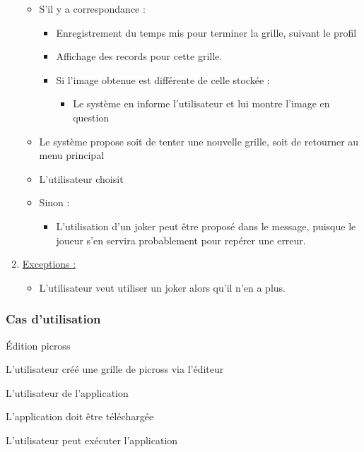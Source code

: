 \documentclass[a4paper, 12pt, twoside]{article}
\begin{document}
\begin{enumerate}
\begin{itemize}
		\item {S'il y a correspondance :}\newline
		\begin{itemize}\setlength{\itemsep}{3mm}
			\item Enregistrement du temps mis pour terminer la grille, suivant le profil
			\item Affichage des records pour cette grille.
			\item {Si l'image obtenue est diff\'erente de celle stock\'ee :}\newline
			\begin{itemize}
				\item Le système en informe l'utilisateur et lui montre l'image en question
			\end{itemize}					
		\end{itemize}	
		\item Le système propose soit de tenter une nouvelle grille, soit de retourner au menu principal
		\item L'utilisateur choisit

		\item {Sinon :}\newline
		\begin{itemize}\setlength{\itemsep}{3mm}
			\item L'utilisation d'un joker peut être proposé dans le message, puisque le joueur s'en servira probablement pour repérer une erreur.
		\end{itemize}			
	\end{itemize}

	\item{\ul{Exceptions :}}\newline
	\begin{itemize}\setlength{\itemsep}{5mm}
		\item L'utilisateur veut utiliser un joker alors qu'il n'en a plus.
	\end{itemize}
\end{enumerate}

\subsubsection*{Cas d'utilisation }

\begin{description}\setlength{\itemsep}{0mm}

 \item[Nom :] \'Edition picross 
 \item[Description :] L'utilisateur créé une grille de picross via l'éditeur
 \item[Acteur :] L'utilisateur de l'application 
 \item[Préalables :] L'application doit être téléchargée
 \item[Conséquents :] L'utilisateur peut exécuter l'application\newline
 
\end{description}
\end{document}
